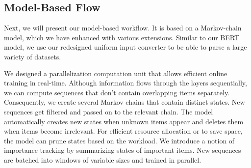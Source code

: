    
    

%

% 

\subsection{Model-Based Flow}
Next, we will present our model-based workflow. It is based on a Markov-chain model, which we have enhanced with various extensions. Similar to our BERT model, we use our redesigned uniform input converter to be able to parse a large variety of datasets.

We designed a parallelization computation unit that allows efficient online training in real-time. Although information flows through the layers sequentially, we can compute sequences that don't contain overlapping items separately. Consequently, we create several Markov chains that contain distinct states. New sequences get filtered and passed on to the relevant chain. The model automatically creates new states when unknown items appear and deletes them when items become irrelevant. For efficient resource allocation or to save space, the model can prune states based on the workload. We introduce a notion of importance tracking by summarizing states of important items. New sequences are batched into windows of variable sizes and trained in parallel.

